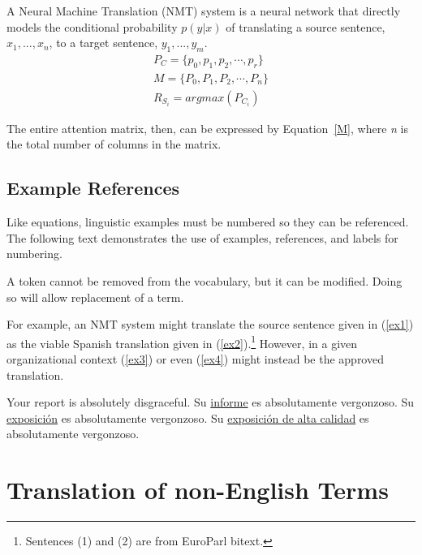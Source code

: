 \documentclass[11pt,table,xcdraw]{article}
\begin{document}
A Neural Machine Translation (NMT) system is a neural network that directly models
the conditional probability $ p(y|x) $ of translating a source
sentence, $ x_{1},...,x_{n} $, to a target sentence, $ y_{1},...,y_{m}$.		
\begin{gather}
    P_{C}=\lbrace{p_{0}, p_{1}, p_{2},\cdots, p_{r}}\rbrace\label{P} \\[-0.25em]
    M=\lbrace{P_{0}, P_{1}, P_{2},\cdots, P_{n}}\rbrace\label{M} \\[-0.25em]
    R_{S_{i}}=argmax(P_{C_{i}})\label{R}
\end{gather}

The entire attention matrix, then, can be expressed by Equation~\ref{M}, where \textit{n}
is the total number of columns in the matrix.

\subsection{Example References}

Like equations, linguistic examples must be numbered so they can be referenced. The following text demonstrates the use of examples, references, and labels for numbering.

A token cannot be removed from the vocabulary, but
it can be modified.  Doing so will allow replacement of a term.

For example, an NMT system might translate the source sentence given
in (\ref{ex1}) as the viable Spanish translation given in
(\ref{ex2}).\footnote{Sentences (1) and (2) are from EuroParl bitext.} However, in a given organizational context (\ref{ex3}) or
even (\ref{ex4}) might instead be the approved translation.

{\footnotesize
\ex[aboveexskip=1ex,belowexskip=0.5ex]
Your report is absolutely disgraceful.\label{ex1}
\xe
\ex[aboveexskip=0ex,belowexskip=0ex]
Su \underline{informe} es absolutamente vergonzoso.\label{ex2}
\xe
\ex[aboveexskip=0.5ex,belowexskip=1.5ex]
Su \underline{exposición} es absolutamente vergonzoso.\label{ex3}
\xe
\ex[aboveexskip=0.5ex,belowexskip=1.5ex]
Su \underline{exposición de alta calidad} es absolutamente vergonzoso.\label{ex4}
\xe
}





\section{Translation of non-English Terms}
\end{document}

